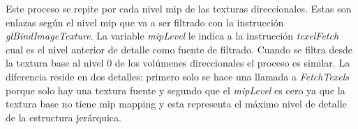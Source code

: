 Este proceso se repite por cada nivel mip de las texturas direccionales. Estas son enlazas según el nivel mip que va a ser filtrado con la instrucción \emph{glBindImageTexture}. La variable \emph{mipLevel} le indica a la instrucción \emph{texelFetch} cual es el nivel anterior de detalle como fuente de filtrado. Cuando se filtra desde la textura base al nivel 0 de los volúmenes direccionales el proceso es similar. La diferencia reside en dos detalles: primero solo se hace una llamada a \emph{FetchTexels} porque solo hay una textura fuente y segundo que el \emph{mipLevel} es cero ya que la textura base no tiene mip mapping y esta representa el máximo nivel de detalle de la estructura jerárquica.


